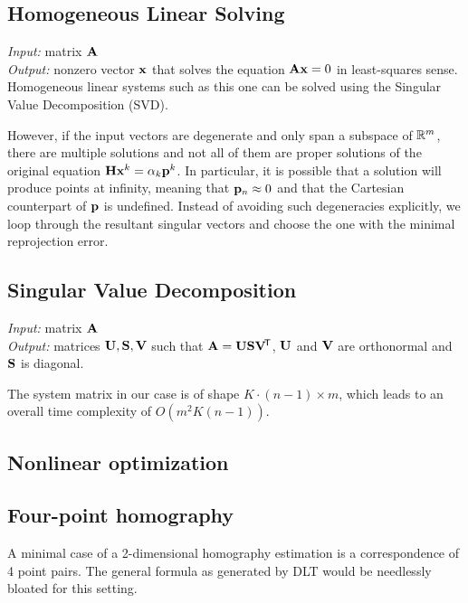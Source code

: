 \subsection{Homogeneous Linear Solving}
\textit{Input:} matrix $\mathbf{A}$\\
\textit{Output:} nonzero vector $\mathbf{x}$ that solves the equation $\mathbf{A} \mathbf{x} = 0$ in least-squares sense.\\

Homogeneous linear systems such as this one can be solved using the Singular Value Decomposition (SVD).

\todo{\dots}
However, if the input vectors are degenerate and only span a subspace of $\mathbb{R}^m$, there are multiple solutions and not all of them are proper solutions of the original equation $\mathbf{H} \mathbf{x}^k = \alpha_k \mathbf{p}^k$.
In particular, it is possible that a solution will produce points at infinity, meaning that $\mathbf{p}_n \approx 0$ and that the Cartesian counterpart of $\mathbf{p}$ is undefined.
Instead of avoiding such degeneracies explicitly, we loop through the resultant singular vectors and choose the one with the minimal reprojection error.

\subsection{Singular Value Decomposition}
\textit{Input:} matrix $\mathbf{A}$\\
\textit{Output:} matrices $\mathbf{U}, \mathbf{S}, \mathbf{V}$ such that $\mathbf{A} = \mathbf{U} \mathbf{S} \mathbf{V}^{\!\mathsf{T}}$, $\mathbf{U}$ and $\mathbf{V}$ are orthonormal and $\mathbf{S}$ is diagonal.\\


The system matrix in our case is of shape $K \cdot (n - 1) \times m$, which leads to an overall time complexity of $O(m^2 K (n - 1))$.

\subsection{Nonlinear optimization}


\subsection{Four-point homography}

A minimal case of a 2-dimensional homography estimation is a correspondence of 4 point pairs.
The general formula as generated by DLT would be needlessly bloated for this setting.

